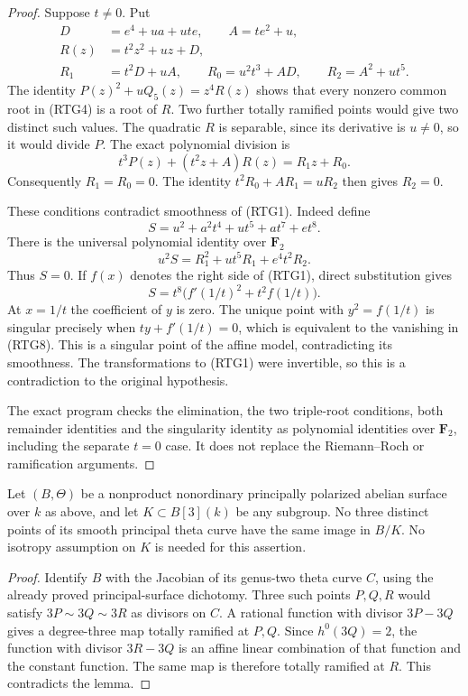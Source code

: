 \begin{proof}
Suppose $t\ne0$. Put
\[
 \begin{aligned}
 D&=e^4+ua+ute,\qquad A=te^2+u,\\
 R(z)&=t^2z^2+uz+D,\\
 R_1&=t^2D+uA,\qquad R_0=u^2t^3+AD,\qquad R_2=A^2+ut^5.
 \end{aligned}                                       \tag{RTG5}
\]
The identity $P(z)^2+uQ_5(z)=z^4R(z)$ shows that every
nonzero common root in (RTG4) is a root of $R$.
Two further totally ramified points would give two distinct such
values. The quadratic $R$ is separable, since its derivative is
$u\ne0$, so it would divide $P$. The exact polynomial division is
\[
              t^3P(z)+(t^2z+A)R(z)=R_1z+R_0.
                                                               \tag{RTG6}
\]
Consequently $R_1=R_0=0$. The identity
$t^2R_0+AR_1=uR_2$ then gives $R_2=0$.

These conditions contradict smoothness of (RTG1). Indeed define
\[
                  S=u^2+a^2t^4+ut^5+at^7+et^8.
\]
There is the universal polynomial identity over $\mathbf F_2$
\[
                  u^2S=R_1^2+ut^5R_1+e^4t^2R_2.       \tag{RTG7}
\]
Thus $S=0$. If $f(x)$ denotes the right side of (RTG1), direct
substitution gives
\[
          S=t^8\bigl(f'(1/t)^2+t^2 f(1/t)\bigr).       \tag{RTG8}
\]
At $x=1/t$ the coefficient of $y$ is zero. The unique point with
$y^2=f(1/t)$ is singular precisely when
$ty+f'(1/t)=0$, which is equivalent to the vanishing in (RTG8).
This is a singular point of the affine model, contradicting its
smoothness. The transformations to (RTG1) were invertible, so this
is a contradiction to the original hypothesis.

The exact program
checks the elimination, the two triple-root conditions, both
remainder identities and the singularity identity as polynomial
identities over $\mathbf F_2$, including the separate $t=0$ case.
It does not replace the Riemann--Roch or ramification arguments.
\end{proof}

\begin{corollary}
\label{cor:root-nonordinary-theta-no-three-triples-candidate}
Let $(B,\Theta)$ be a nonproduct nonordinary principally polarized
abelian surface over $k$ as above, and let $K\subset B[3](k)$ be
any subgroup. No three distinct points of its smooth principal
theta curve have the same image in $B/K$. No isotropy assumption
on $K$ is needed for this assertion.
\end{corollary}
\begin{proof}
Identify $B$ with the Jacobian of its genus-two theta curve $C$,
using the already proved principal-surface dichotomy. Three such
points $P,Q,R$ would satisfy
$3P\sim3Q\sim3R$ as divisors on $C$. A rational function with
divisor $3P-3Q$ gives a degree-three map totally ramified at
$P,Q$. Since $h^0(3Q)=2$, the function with divisor $3R-3Q$
is an affine linear combination of that function and the constant
function. The same map is therefore totally ramified at $R$.
This contradicts the lemma.
\end{proof}

